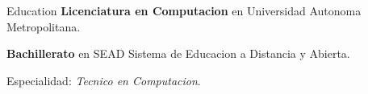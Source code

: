 \begin{rubric}{Education}
	\entry*[2017 -- \ldots]%
	\textbf{Licenciatura en Computacion} en Universidad Autonoma Metropolitana.\par
	\entry*[2016 -- 2017]%
	\textbf{Bachillerato} en SEAD Sistema de Educacion a Distancia y Abierta.
	\par Especialidad: \emph{Tecnico en Computacion}.
\end{rubric}
